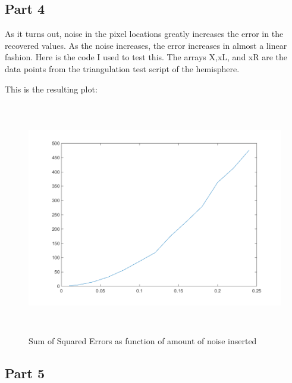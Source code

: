 \documentclass[11pt,psfig]{article}
\begin{document}
\subsection{Part 4}

As it turns out, noise in the pixel locations greatly increases the error in the recovered values. As the noise increases, the error increases in almost a linear fashion. Here is the code I used to test this. The arrays X,xL, and xR are the data points from the triangulation test script of the hemisphere.

This is the resulting plot:
\begin{figure}[H]
\centering
\includegraphics[height=4in]{prob2part4plot.png}
\caption{Sum of Squared Errors as function of amount of noise inserted}
\end{figure}

\newpage

\subsection{Part 5}
\end{document}
